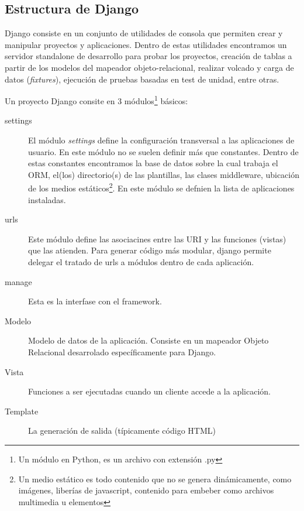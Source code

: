 \documentclass[a4paper]{report}
\begin{document}
\subsection*{Estructura de Django}

Django consiste en un conjunto de utilidades de consola que permiten crear y
manipular proyectos y aplicaciones. Dentro de estas utilidades encontramos 
un servidor standalone de desarrollo para probar los proyectos, creación de 
tablas a partir de los modelos del mapeador objeto-relacional, realizar 
volcado y carga de datos (\emph{fixtures}), ejecución de pruebas basadas 
en test de unidad, entre otras.

Un proyecto Django consite en 3 módulos\footnote{Un módulo en Python, es un
archivo con extensión .py} básicos:
\begin{description}
 \item [settings]{El módulo \emph{settings} define la configuración transversal
a las aplicaciones de usuario. En este módulo no se suelen definir más que constantes.
Dentro de estas constantes encontramos la base de datos sobre la cual trabaja el ORM, 
el(los) directorio(s) de las plantillas, las clases middleware,
ubicación de los medios estáticos\footnote{
Un medio estático es todo contenido que no se genera dinámicamente, como imágenes, 
liberías de javascript, contenido para embeber como archivos multimedia u elementos}.
En este módulo se defnien la lista de aplicaciones instaladas.}
 \item [urls]{
  Este módulo define las asociacines entre las URI y las funciones (vistas) que las
atienden. Para generar código más modular, django permite delegar el tratado
de urls a módulos dentro de cada aplicación.

}
 \item [manage]{
  Esta es la interfase con el framework.
}
\end{description}


\begin{description}
\item[Modelo] Modelo de datos de la aplicación. Consiste en un mapeador Objeto
Relacional desarrolado específicamente para Django.
\item[Vista] Funciones a ser ejecutadas cuando un cliente accede a la
aplicación.
\item[Template] La generación de salida (típicamente código HTML)
\end{description}
\end{document}
